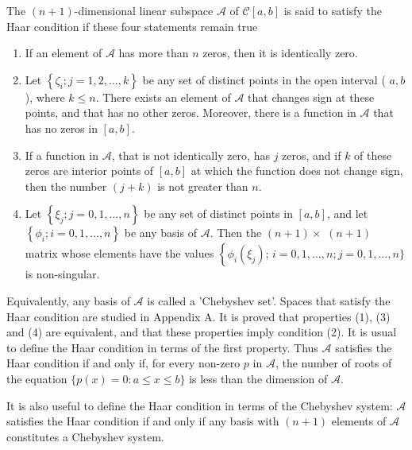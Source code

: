 \documentclass[11pt]{article}
\begin{document}
\begin{definition}The $(n+1)$-dimensional linear subspace $\mathscr{A}$ of $\mathscr{C}[a, b]$ is said to satisfy the Haar condition if these four statements remain true 

\begin{enumerate}[label=(\arabic*)]
\item If an element of $\mathscr{A}$ has more than $n$ zeros, then it is identically zero.

\item Let $\left\{\zeta_{i} ; j=1,2, \ldots, k\right\}$ be any set of distinct points in the open interval ( $a, b$ ), where $k \leqslant n$. There exists an element of $\mathscr{A}$ that changes sign at these points, and that has no other zeros. Moreover, there is a function in $\mathscr{A}$ that has no zeros in $[a, b]$.

\item If a function in $\mathscr{A}$, that is not identically zero, has $j$ zeros, and if $k$ of these zeros are interior points of $[a, b]$ at which the function does not change sign, then the number $(j+k)$ is not greater than $n$.

\item Let $\left\{\xi_{j} ; j=0,1, \ldots, n\right\}$ be any set of distinct points in $[a, b]$, and let $\left\{\phi_{i} ; i=0,1, \ldots, n\right\}$ be any basis of $\mathscr{A}$. Then the $(n+1) \times$ $(n+1)$ matrix whose elements have the values $\left\{\phi_{i}\left(\xi_{j}\right)\right.$; $i=0,1, \ldots, n ; j=0,1, \ldots, n\}$ is non-singular.
\end{enumerate}
\end{definition}

\begin{remark}
Equivalently, any basis of $\mathscr{A}$ is called a 'Chebyshev set'. Spaces that satisfy the Haar condition are studied in Appendix A. It is proved that properties (1), (3) and (4) are equivalent, and that these properties imply condition (2). It is usual to define the Haar condition in terms of the first property. Thus $\mathscr{A}$ satisfies the Haar condition if and only if, for every non-zero $p$ in $\mathscr{A}$, the number of roots of the equation $\{p(x)=0 : a \leqslant x \leqslant b\}$ is less than the dimension of $\mathscr{A}$.
\end{remark}

\begin{remark}
It is also useful to define the Haar condition in terms of the Chebyshev system: 
$\mathscr{A}$ satisfies the Haar condition if and only if any basis with $(n+1)$ elements of $\mathscr{A}$ constitutes a Chebyshev system.
\end{remark}
\end{document}
